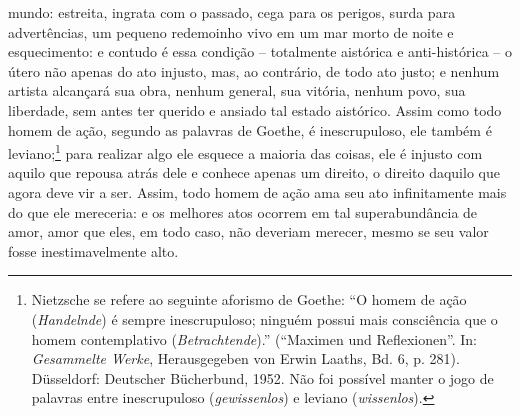 mundo: estreita, ingrata com o passado, cega para os perigos, surda para
advertências, um pequeno redemoinho vivo em um mar morto de noite e
esquecimento: e contudo é essa condição -- totalmente aistórica e
anti-histórica -- o útero não apenas do ato injusto, mas, ao contrário,
de todo ato justo; e nenhum artista alcançará sua obra, nenhum general,
sua vitória, nenhum povo, sua liberdade, sem antes ter querido e ansiado
tal estado aistórico. Assim como todo homem de ação, segundo as palavras
de Goethe, é inescrupuloso, ele também é leviano;\footnote{Nietzsche se refere ao seguinte
  aforismo de Goethe: ``O homem de ação (\emph{Handelnde}) é sempre
  inescrupuloso; ninguém possui mais consciência que o homem
  contemplativo (\emph{Betrachtende}).'' (``Maximen und Reflexionen''.
  In: \emph{Gesammelte Werke}, Herausgegeben von Erwin Laaths, Bd. 6,
  p. 281). Düsseldorf: Deutscher Bücherbund, 1952. Não foi possível
  manter o jogo de palavras entre inescrupuloso (\emph{gewissenlos}) e
  leviano (\emph{wissenlos}).} para realizar algo
ele esquece a maioria das coisas, ele é injusto com aquilo que repousa
atrás dele e conhece apenas um direito, o direito daquilo que agora deve
vir a ser. Assim, todo homem de ação ama seu ato infinitamente mais do
que ele mereceria: e os melhores atos ocorrem em tal superabundância de
amor, amor que eles, em todo caso, não deveriam merecer, mesmo se seu
valor fosse inestimavelmente alto.

